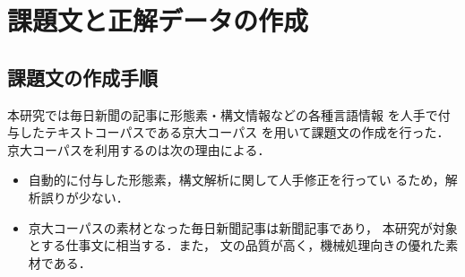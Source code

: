 \documentclass[japanese]{jnlp_1.3e}
\begin{document}
\section{課題文と正解データの作成}


\subsection{課題文の作成手順}
\label{課題文の作成手順}

本研究では毎日新聞の記事に形態素・構文情報などの各種言語情報
を人手で付与したテキストコーパスである京大コーパス
を用いて課題文の作成を行った．
京大コーパスを利用するのは次の理由による．
\begin{itemize}
 \item
      自動的に付与した形態素，構文解析に関して人手修正を行ってい
      るため，解析誤りが少ない．
 \item      
      京大コーパスの素材となった毎日新聞記事は新聞記事であり，
      本研究が対象とする仕事文に相当する．また，
      文の品質が高く，機械処理向きの優れた素材である．
\end{itemize}
\end{document}
